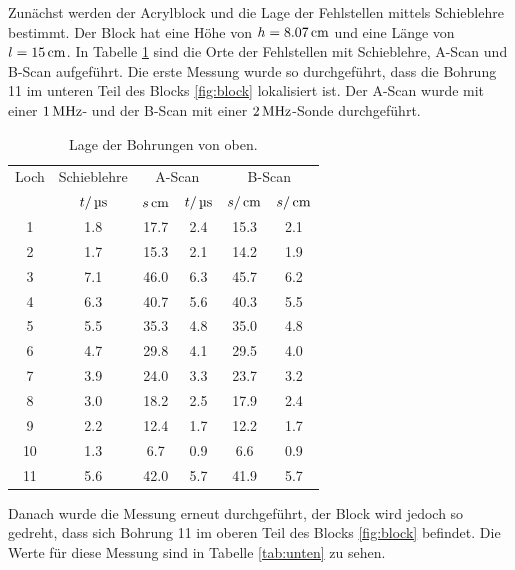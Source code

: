 Zunächst werden der Acrylblock und die Lage der Fehlstellen mittels Schieblehre
bestimmt. Der Block hat eine Höhe von $h=8.07\,\si{\centi\meter}$ und eine Länge von $l=15\,\si{\centi\meter}$.
In Tabelle \ref{tab:oben} sind die Orte der Fehlstellen mit Schieblehre, A-Scan
und B-Scan aufgeführt. Die erste Messung wurde so durchgeführt, dass die Bohrung
11 im unteren Teil des Blocks \ref{fig:block} lokalisiert ist. Der A-Scan wurde
mit einer $1\,\si{\mega\hertz}$- und der B-Scan mit einer $2\,\si{\mega\hertz}$-Sonde durchgeführt.
\begin{table}[H]
  \centering
  \begin{tabular}{cc|cc|cc}
    \toprule
    \multicolumn{1}{c}{Loch}& \multicolumn{1}{c|}{Schieblehre} & \multicolumn{2}{c|}{A-Scan}
    & \multicolumn{2}{c}{B-Scan} \\
    & $t/\,\si{\micro\second}$ & $s\,\si{\centi\meter}$ & $t/\,\si{\micro\second}$ & $s/\,\si{\centi\meter}$ & $s/\,\si{\centi\meter}$ \\
    \midrule
     1  &  1.8 &  17.7 & 2.4 & 15.3 & 2.1 \\
     2  &  1.7 &  15.3 & 2.1 & 14.2 & 1.9 \\
     3  &  7.1 &  46.0 & 6.3 & 45.7 & 6.2 \\
     4  &  6.3 &  40.7 & 5.6 & 40.3 & 5.5 \\
     5  &  5.5 &  35.3 & 4.8 & 35.0 & 4.8 \\
     6  &  4.7 &  29.8 & 4.1 & 29.5 & 4.0 \\
     7  &  3.9 &  24.0 & 3.3 & 23.7 & 3.2 \\
     8  &  3.0 &  18.2 & 2.5 & 17.9 & 2.4 \\
     9  &  2.2 &  12.4 & 1.7 & 12.2 & 1.7 \\
    10  &  1.3 &   6.7 & 0.9 &  6.6 & 0.9 \\
    11  &  5.6 &  42.0 & 5.7 & 41.9 & 5.7 \\
    \bottomrule
  \end{tabular}
  \caption{Lage der Bohrungen von oben.}
  \label{tab:oben}
\end{table}
Danach wurde die Messung erneut durchgeführt, der Block wird jedoch so gedreht,
dass sich Bohrung 11 im oberen Teil des Blocks \ref{fig:block} befindet.
Die Werte für diese Messung sind in Tabelle \ref{tab:unten} zu sehen.
